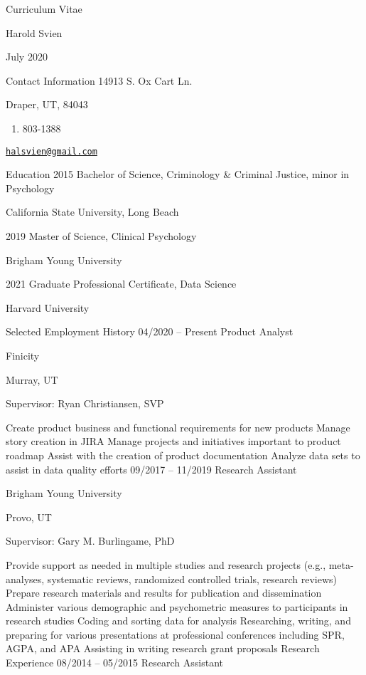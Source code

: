 \documentclass[
]{article}
\author{Hal Svien}
\date{07/12/2020}
\providecommand{\tightlist}{%
  \setlength{\itemsep}{0pt}\setlength{\parskip}{0pt}}
\begin{document}
Curriculum Vitae

Harold Svien

July 2020

Contact Information
14913 S. Ox Cart Ln.

Draper, UT, 84043

\begin{enumerate}
\def\labelenumi{(\arabic{enumi})}
\setcounter{enumi}{759}
\tightlist
\item
  803-1388
\end{enumerate}

\href{mailto:halsvien@gmail.com}{\nolinkurl{halsvien@gmail.com}}

Education
2015 Bachelor of Science, Criminology \& Criminal Justice, minor in Psychology

California State University, Long Beach

2019 Master of Science, Clinical Psychology

Brigham Young University

2021 Graduate Professional Certificate, Data Science

Harvard University

Selected Employment History
04/2020 -- Present Product Analyst

Finicity

Murray, UT

Supervisor: Ryan Christiansen, SVP

Create product business and functional requirements for new products
Manage story creation in JIRA
Manage projects and initiatives important to product roadmap
Assist with the creation of product documentation
Analyze data sets to assist in data quality efforts
09/2017 -- 11/2019 Research Assistant

Brigham Young University

Provo, UT

Supervisor: Gary M. Burlingame, PhD

Provide support as needed in multiple studies and research projects (e.g., meta-analyses, systematic reviews, randomized controlled trials, research reviews)
Prepare research materials and results for publication and dissemination
Administer various demographic and psychometric measures to participants in research studies
Coding and sorting data for analysis
Researching, writing, and preparing for various presentations at professional conferences including SPR, AGPA, and APA
Assisting in writing research grant proposals
Research Experience
08/2014 -- 05/2015 Research Assistant
\end{document}
